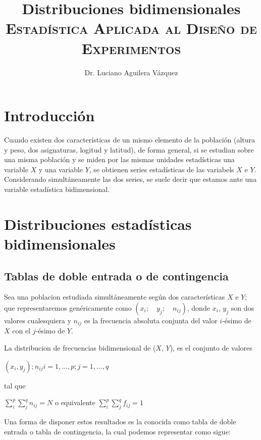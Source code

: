 \documentclass[11 pts, letterpaper, twosided]{article}
\title{Distribuciones bidimensionales\\
      {\normalsize \textsc{Estadística Aplicada al Diseño de Experimentos}}}
\author{Dr. Luciano Aguilera Vázquez}
\begin{document}
\maketitle

\section{Introducción}

Cuando existen dos características de un mismo elemento de la
población (altura y peso, dos asignaturas, logitud y latitud), de
forma general, si se estudian sobre una misma población y se miden por
las mismas unidades estadísticas una variable $X$ y una variable $Y$,
se obtienen series estadísticas de las variabels $X$ e
$Y$. Considerando simultáneamente las dos series, se suele decir que
estamos ante una variable estadística bidimensional.

\section[Dist. est. bidimensionales]{Distribuciones estadísticas bidimensionales}

\subsection{Tablas de doble entrada o de contingencia}

Sea una poblacion estudiada simultáneamente según dos características
$X$ e $Y$; que representaremos genéricamente como $(x_i;\quad
y_j;\quad n_{ij})$, donde $x_i$, $y_j$ son dos valores cualesquiera y
$n_{ij}$ es la frecuencia absoluta conjunta del valor $i$-ésimo de $X$
con el $j$-ésimo de $Y$.

La distribucion de frecuencias bidimensional de ($X$, $Y$), es el
conjunto de valores

${(x_i, y_j); n_{ij}} i = 1, ..., p; j = 1, ..., q$

tal que

$\sum_i^p\sum_j^q n_{ij}= N$ o equivalente $\sum_i^p\sum_j^q f_{ij} = 1$

Una forma de disponer estos resultados es la conocida como tabla de
doble entrada o tabla de contingencia, la cual podemos representar
como sigue:
\end{document}
